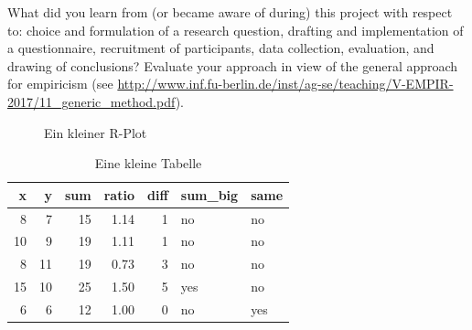 \documentclass[de]{agse-empir-report}\usepackage[]{graphicx}\usepackage[]{color}
\makeatletter
\newenvironment{kframe}{%
 \def\at@end@of@kframe{}%
 \ifinner\ifhmode%
  \def\at@end@of@kframe{\end{minipage}}%
  \begin{minipage}{\columnwidth}%
 \fi\fi%
 \def\FrameCommand##1{\hskip\@totalleftmargin \hskip-\fboxsep
 \colorbox{shadecolor}{##1}\hskip-\fboxsep
     \hskip-\linewidth \hskip-\@totalleftmargin \hskip\columnwidth}%
 \MakeFramed {\advance\hsize-\width
   \@totalleftmargin\z@ \linewidth\hsize
   \@setminipage}}%
 {\par\unskip\endMakeFramed%
 \at@end@of@kframe}
\newenvironment{knitrout}{}{} %
\makeatother
\begin{document}
What did you learn from (or became aware of during) this project with
respect to: choice and formulation of a research question,
drafting and implementation of a questionnaire,
recruitment of participants,
data collection, evaluation, and drawing of conclusions?
Evaluate your approach in view of the general approach for
empiricism (see
\url{http://www.inf.fu-berlin.de/inst/ag-se/teaching/V-EMPIR-2017/11_generic_method.pdf}).

\lipsum[11-13]

\begin{figure}
\begin{knitrout}
\color{fgcolor}\begin{kframe}


{\ttfamily\noindent\bfseries{}}

{\ttfamily\noindent\bfseries{}}

{\ttfamily\noindent\bfseries\color{errorcolor}{\#\# Error in print(plt): Objekt 'plt' nicht gefunden}}\end{kframe}
\end{knitrout}
    \caption{Ein kleiner R-Plot}
\end{figure}

\begin{table}
    \centering
\begin{knitrout}
\color{fgcolor}
\begin{tabular}{rrrrrll}
\toprule
x & y & sum & ratio & diff & sum\_big & same\\
\midrule
8 & 7 & 15 & 1.14 & 1 & no & no\\
10 & 9 & 19 & 1.11 & 1 & no & no\\
8 & 11 & 19 & 0.73 & 3 & no & no\\
15 & 10 & 25 & 1.50 & 5 & yes & no\\
6 & 6 & 12 & 1.00 & 0 & no & yes\\
\bottomrule
\end{tabular}


\end{knitrout}
    \caption{Eine kleine Tabelle}
\end{table}

\nocite{*}
\end{document}
